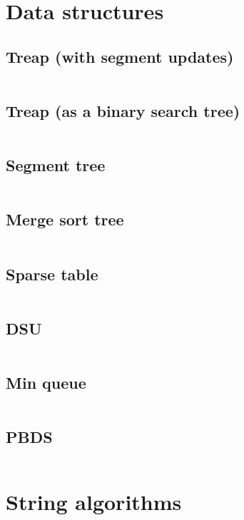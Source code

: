 ﻿\documentclass[a4paper,10pt,twocolumn,oneside]{article}
\begin{document}
\pagestyle{fancy}
\fancyfoot{}
\fancyhead[R]{\thepage}

\section{Data structures}
\subsection{Treap (with segment updates)}
\inputminted[breaklines]{cpp}{Data structures/treap (segment updates).cpp}
\subsection{Treap (as a binary search tree)}
\inputminted[breaklines]{cpp}{Data structures/treap (as a binsearch tree).cpp}
\subsection{Segment tree}
\inputminted[breaklines]{cpp}{Data structures/segment tree.cpp}
\subsection{Merge sort tree}
\inputminted[breaklines]{cpp}{Data structures/mergesort tree.cpp}
\subsection{Sparse table}
\inputminted[breaklines]{cpp}{Data structures/sparse table.cpp}
\subsection{DSU}
\inputminted[breaklines]{cpp}{Data structures/dsu.cpp}
\subsection{Min queue}
\inputminted[breaklines]{cpp}{Data structures/min queue.cpp}
\subsection{PBDS}
\inputminted[breaklines]{cpp}{Data structures/pbds.cpp}

\section{String algorithms}
\end{document}
